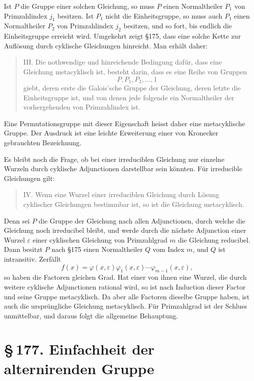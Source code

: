 \documentclass[11pt]{article}
\providecommand{\sect}[2]{\section*{\S\,#1. #2}}
\begin{document}
Ist $P$ die Gruppe einer solchen Gleichung, so muss $P$ einen Normaltheiler $P_1$ von Primzahlindex $j_1$ besitzen. Ist $P_1$ nicht die Einheitsgruppe, so muss auch $P_1$ einen Normaltheiler $P_2$ von Primzahlindex $j_2$ besitzen, und so fort, bis endlich die Einheitsgruppe erreicht wird. Umgekehrt zeigt §175, dass eine solche Kette zur Auflösung durch cyklische Gleichungen hinreicht. Man erhält daher:

\begin{quote}
III. Die nothwendige und hinreichende Bedingung dafür, dass eine Gleichung metacyklisch ist, besteht darin, dass es eine Reihe von Gruppen
\[
        P,
        P_1,
        P_2,
        \ldots,
        1
\]
giebt, deren erste die Galois'sche Gruppe der Gleichung, deren letzte die Einheitsgruppe ist, und von denen jede folgende ein Normaltheiler der vorhergehenden von Primzahlindex ist.
\end{quote}

Eine Permutationsgruppe mit dieser Eigenschaft heisst daher eine metacyklische Gruppe. Der Ausdruck ist eine leichte Erweiterung einer von Kronecker gebrauchten Bezeichnung.

Es bleibt noch die Frage, ob bei einer irreduciblen Gleichung nur einzelne Wurzeln durch cyklische Adjunctionen darstellbar sein könnten. Für irreducible Gleichungen gilt:

\begin{quote}
IV. Wenn eine Wurzel einer irreduciblen Gleichung durch Lösung cyklischer Gleichungen bestimmbar ist, so ist die Gleichung metacyklisch.
\end{quote}

Denn sei $P$ die Gruppe der Gleichung nach allen Adjunctionen, durch welche die Gleichung noch irreducibel bleibt, und werde durch die nächste Adjunction einer Wurzel $\varepsilon$ einer cyklischen Gleichung von Primzahlgrad $m$ die Gleichung reducibel. Dann besitzt $P$ nach §175 einen Normaltheiler $Q$ vom Index $m$, und $Q$ ist intransitiv. Zerfällt
\[
        f(x)=\varphi(x,
\varepsilon)\varphi_1(x,
\varepsilon)\cdots
        \varphi_{m-1}(x,
\varepsilon),
\]
so haben die Factoren gleichen Grad. Hat einer von ihnen eine Wurzel, die durch weitere cyklische Adjunctionen rational wird, so ist nach Induction dieser Factor und seine Gruppe metacyklisch. Da aber alle Factoren dieselbe Gruppe haben, ist auch die ursprüngliche Gleichung metacyklisch. Für Primzahlgrad ist der Schluss unmittelbar, und daraus folgt die allgemeine Behauptung.


\sect{177}{Einfachheit der alternirenden Gruppe}
\end{document}
